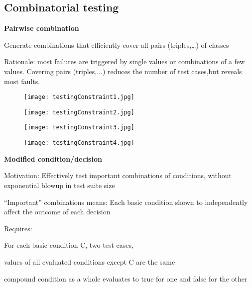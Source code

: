 \subsection{Combinatorial testing}
\textbf{Pairwise combination} 
\begin{itemize*}
	\item Generate combinations that efficiently cover all 	pairs (triples,…) of classes
	\item Rationale: most failures are triggered by single values or combinations of a few values. Covering pairs (triples,...) reduces the number of test cases,but reveals most faults.
\end{itemize*}

\begin{figure}[h!]
	\centering
	\texttt{[image: testingConstraint1.jpg]}
	\caption{}
	\label{fig:testingC1}
\end{figure}
\begin{figure}[h!]
	\centering
	\texttt{[image: testingConstraint2.jpg]}
	\caption{}
	\label{fig:testingC2}
\end{figure}
\begin{figure}[h!]
	\centering
	\texttt{[image: testingConstraint3.jpg]}
	\caption{}
	\label{fig:testingC3}
\end{figure}
\begin{figure}[h!]
	\centering
	\texttt{[image: testingConstraint4.jpg]}
	\caption{}
	\label{fig:testingC4}
\end{figure}

\textbf{Modified condition/decision}
\begin{itemize*}
\item Motivation: Effectively test important combinations of conditions, without exponential blowup in test suite size 
\begin{itemize*} 
\item “Important” combinations means: Each basic condition shown to independently affect the outcome of each decision
\end{itemize*}
\item Requires:
\begin{itemize*}
\item For each basic condition C, two test cases,
\item values of all evaluated conditions except C are the same 
\item compound condition as a whole evaluates to true for one and false for the other
\end{itemize*}
\end{itemize*}

